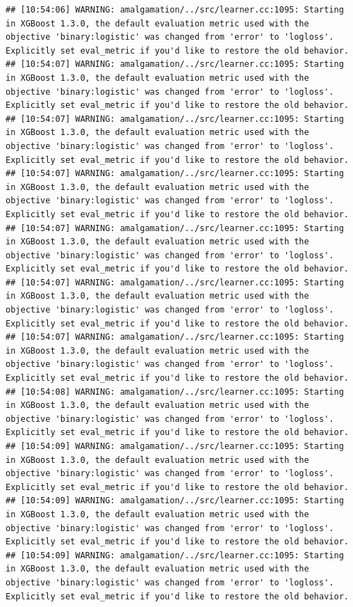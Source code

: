 \documentclass[
]{scrbook}
\begin{document}
\begin{verbatim}
## [10:54:06] WARNING: amalgamation/../src/learner.cc:1095: Starting in XGBoost 1.3.0, the default evaluation metric used with the objective 'binary:logistic' was changed from 'error' to 'logloss'. Explicitly set eval_metric if you'd like to restore the old behavior.
## [10:54:07] WARNING: amalgamation/../src/learner.cc:1095: Starting in XGBoost 1.3.0, the default evaluation metric used with the objective 'binary:logistic' was changed from 'error' to 'logloss'. Explicitly set eval_metric if you'd like to restore the old behavior.
## [10:54:07] WARNING: amalgamation/../src/learner.cc:1095: Starting in XGBoost 1.3.0, the default evaluation metric used with the objective 'binary:logistic' was changed from 'error' to 'logloss'. Explicitly set eval_metric if you'd like to restore the old behavior.
## [10:54:07] WARNING: amalgamation/../src/learner.cc:1095: Starting in XGBoost 1.3.0, the default evaluation metric used with the objective 'binary:logistic' was changed from 'error' to 'logloss'. Explicitly set eval_metric if you'd like to restore the old behavior.
## [10:54:07] WARNING: amalgamation/../src/learner.cc:1095: Starting in XGBoost 1.3.0, the default evaluation metric used with the objective 'binary:logistic' was changed from 'error' to 'logloss'. Explicitly set eval_metric if you'd like to restore the old behavior.
## [10:54:07] WARNING: amalgamation/../src/learner.cc:1095: Starting in XGBoost 1.3.0, the default evaluation metric used with the objective 'binary:logistic' was changed from 'error' to 'logloss'. Explicitly set eval_metric if you'd like to restore the old behavior.
## [10:54:07] WARNING: amalgamation/../src/learner.cc:1095: Starting in XGBoost 1.3.0, the default evaluation metric used with the objective 'binary:logistic' was changed from 'error' to 'logloss'. Explicitly set eval_metric if you'd like to restore the old behavior.
## [10:54:08] WARNING: amalgamation/../src/learner.cc:1095: Starting in XGBoost 1.3.0, the default evaluation metric used with the objective 'binary:logistic' was changed from 'error' to 'logloss'. Explicitly set eval_metric if you'd like to restore the old behavior.
## [10:54:09] WARNING: amalgamation/../src/learner.cc:1095: Starting in XGBoost 1.3.0, the default evaluation metric used with the objective 'binary:logistic' was changed from 'error' to 'logloss'. Explicitly set eval_metric if you'd like to restore the old behavior.
## [10:54:09] WARNING: amalgamation/../src/learner.cc:1095: Starting in XGBoost 1.3.0, the default evaluation metric used with the objective 'binary:logistic' was changed from 'error' to 'logloss'. Explicitly set eval_metric if you'd like to restore the old behavior.
## [10:54:09] WARNING: amalgamation/../src/learner.cc:1095: Starting in XGBoost 1.3.0, the default evaluation metric used with the objective 'binary:logistic' was changed from 'error' to 'logloss'. Explicitly set eval_metric if you'd like to restore the old behavior.
\end{verbatim}
\end{document}

